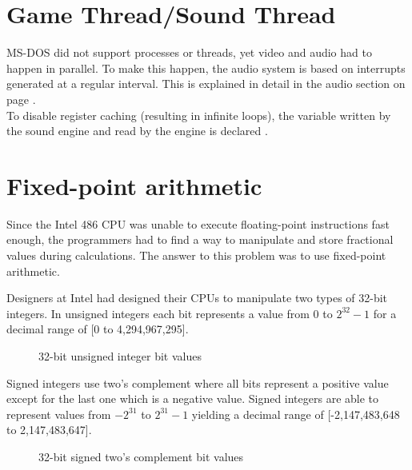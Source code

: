 \section{Game Thread/Sound Thread}
MS-DOS did not support processes or threads, yet video and audio had to happen in parallel. To make this happen, the audio system is based on interrupts generated at a regular interval. This is explained in detail in the audio section on page \pageref{dmx_section}.\\
To disable register caching (resulting in infinite loops), the variable written by the sound engine and read by the \doom{} engine is declared .







\section{Fixed-point arithmetic}
Since the Intel 486 CPU was unable to execute floating-point instructions fast enough, the programmers had to find a way to manipulate and store fractional values during calculations. The answer to this problem was to use fixed-point arithmetic.\\
\par
Designers at Intel had designed their CPUs to manipulate two types of 32-bit integers. In unsigned integers each bit represents a value from $0$ to $2^{32}-1$ for a decimal range of [0 to 4,294,967,295].\\
\par
\begin{figure}[H]
 \centering
  
 \caption{32-bit unsigned integer bit values} 
\end{figure}
\par
Signed integers use two's complement where all bits represent a positive value except for the last one which is a negative value. Signed integers are able to represent values from $-2^{31}$ to $2^{31}-1$ yielding a decimal range of [-2,147,483,648 to 2,147,483,647].\\
\par
\begin{figure}[H]
 \centering
  
 \caption{32-bit signed two's complement bit values} 
\end{figure}
\par


